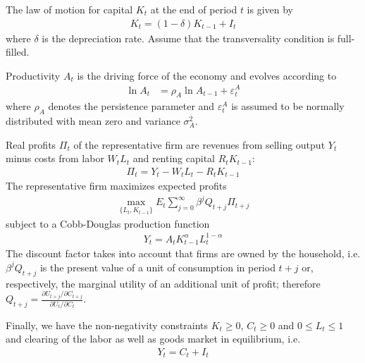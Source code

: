 \documentclass[a4paper]{scrartcl}
\begin{document}
    The law of motion for capital $K_t$ at the end of period $t$ is given by
    \begin{align*}
        K_{t} = (1-\delta)K_{t-1} + I_t
    \end{align*}
    where $\delta$ is the depreciation rate. Assume that the transversality condition is full-filled.
    
    Productivity $A_t$ is the driving force of the economy and evolves according to
    \begin{align*}
        \ln{A_{t}} & =\rho_A \ln{A_{t-1}}  + \varepsilon_t^A
    \end{align*}
    where $\rho_A$ denotes the persistence parameter and $\varepsilon_t^A$ is assumed to be normally distributed with mean zero and variance $\sigma_A^2$.
    
    Real profits $\Pi_t$ of the representative firm are revenues from selling output $Y_t$ minus costs from labor $W_t L_t$ and renting capital $R_t K_{t-1}$:
    \begin{align*}
        \Pi_t = Y_{t} - W_{t} L_{t} - R_{t} K_{t-1}
    \end{align*}
    The representative firm maximizes expected profits
    \begin{align*}
        \underset{\{L_{t},K_{t-1}\}}{\max} E_t \sum_{j=0}^{\infty} \beta^j Q_{t+j}\Pi_{t+j}
    \end{align*}
    subject to a Cobb-Douglas production function
    \begin{align*}
        Y_t =  A_t K_{t-1}^\alpha L_t^{1-\alpha}
    \end{align*}
    The discount factor takes into account that firms are owned by the household, i.e. $\beta^j Q_{t+j}$ is the present value of a unit of consumption in period $t+j$ or, respectively, the marginal utility of an additional unit of profit; therefore $Q_{t+j}=\frac{\partial U_{t+j}/\partial C_{t+j}}{\partial U_{t}/\partial C_{t}}$.
    
    Finally, we have the non-negativity constraints	$K_t \geq0$, $C_t \geq 0$ and $0\leq L_t \leq 1$ and clearing of the labor as well as goods market in equilibrium, i.e.
    \begin{align*}
        Y_t = C_t + I_t
    \end{align*}
    
\end{document}
